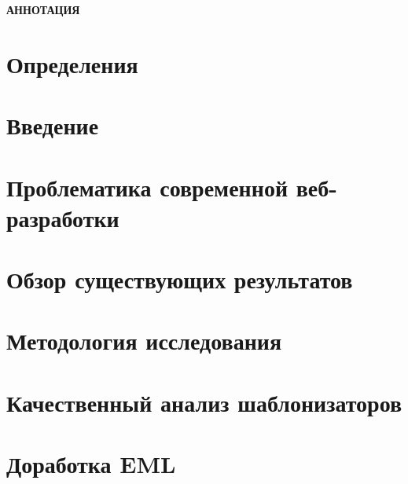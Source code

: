 





\newpage
\begin{center}
  \textbf{\large АННОТАЦИЯ}
  
\end{center}


\newpage
\tableofcontents


\section*{Определения}


\setcounter{page}{2}

\section*{Введение}


\newpage
\section{Проблематика современной веб-разработки}


\newpage
\section{Обзор существующих результатов}


\newpage
\section{Методология исследования}


\newpage
\section{Качественный анализ шаблонизаторов}


\newpage
\section{Доработка EML}


